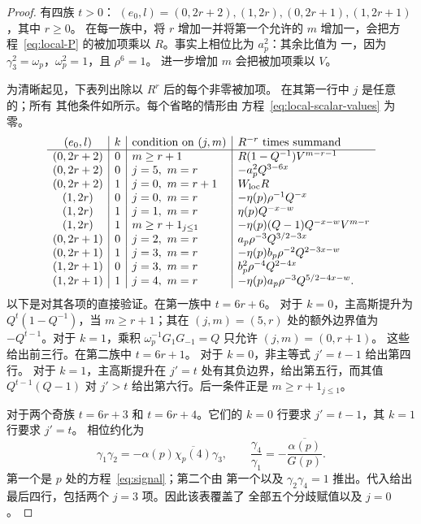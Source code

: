 \documentclass[11pt,a4paper]{article}
\numberwithin{equation}{section}
\numberwithin{figure}{section}
\theoremstyle{definition}
\theoremstyle{remark}
\begin{document}
\begin{proof}
有四族 $t>0$：
$(e_0,l)=(0,2r+2),(1,2r),(0,2r+1),(1,2r+1)$，其中 $r\ge0$。
在每一族中，将 $r$ 增加一并将第一个允许的 $m$
增加一，会把方程~\eqref{eq:local-P} 的被加项乘以
$R$。事实上相位比为 $a_p^2$：其余比值为
一，因为 $\gamma_3^2=\omega_p$，$\omega_p^2=1$，且 $\rho^6=1$。
进一步增加 $m$ 会把被加项乘以 $V$。

为清晰起见，下表列出除以 $R^r$ 后的每个非零被加项。
在其第一行中 $j$ 是任意的；所有
其他条件如所示。每个省略的情形由
方程~\eqref{eq:local-scalar-values} 为零。
\begin{equation}\label{eq:local-family-table}
\begin{array}{c|c|l|l}
 (e_0,l)&k&\text{condition on }(j,m)&R^{-r}\text{ times summand}\\\hline
 (0,2r+2)&0&m\ge r+1&R(1-Q^{-1})V^{m-r-1}\\
 (0,2r+2)&0&j=5,\ m=r&-a_p^2Q^{3-6x}\\
 (0,2r+2)&1&j=0,\ m=r+1&W_{\rm loc}R\\
 (1,2r)&0&j=0,\ m=r&-\eta(p)\rho^{-1}Q^{-x}\\
 (1,2r)&1&j=1,\ m=r&\eta(p)Q^{-x-w}\\
 (1,2r)&1&m\ge r+1_{j\le1}&-\eta(p)(Q-1)Q^{-x-w}V^{m-r}\\
 (0,2r+1)&0&j=2,\ m=r&a_p\rho^{-3}Q^{3/2-3x}\\
 (0,2r+1)&1&j=3,\ m=r&-\eta(p)b_p\rho^{-2}Q^{2-3x-w}\\
 (1,2r+1)&0&j=3,\ m=r&b_p^2\rho^{-4}Q^{2-4x}\\
 (1,2r+1)&1&j=4,\ m=r&-\eta(p)a_p\rho^{-3}Q^{5/2-4x-w}.
\end{array}
\end{equation}
以下是对其各项的直接验证。在第一族中 $t=6r+6$。
对于 $k=0$，主高斯提升为
$Q^t(1-Q^{-1})$，当 $m\ge r+1$；其在
$(j,m)=(5,r)$ 处的额外边界值为 $-Q^{t-1}$。对于 $k=1$，乘积
$\omega_p^{-1}G_1G_{-1}=Q$ 只允许 $(j,m)=(0,r+1)$。
这些给出前三行。在第二族中 $t=6r+1$。
对于 $k=0$，非主等式 $j'=t-1$ 给出第四行。
对于 $k=1$，主高斯提升在
$j'=t$ 处有其负边界，给出第五行，而其值 $Q^{t-1}(Q-1)$ 对
$j'>t$ 给出第六行。后一条件正是
$m\ge r+1_{j\le1}$。

对于两个奇族 $t=6r+3$ 和 $t=6r+4$。它们的 $k=0$
行要求 $j'=t-1$，其 $k=1$ 行要求 $j'=t$。
相位约化为
\[
 \gamma_1\gamma_2
       =-\alpha(p)\overline{\chi_p(4)}\gamma_3,
 \qquad
 \frac{\gamma_4}{\gamma_1}
       =-\frac{\overline{\alpha(p)}}{G(p)}.
\]
第一个是 $p$ 处的方程~\eqref{eq:signal}；第二个由
第一个以及 $\gamma_2\gamma_4=1$ 推出。代入给出
最后四行，包括两个 $j=3$ 项。因此该表覆盖了
全部五个分歧赋值以及 $j=0$。


\end{proof}
\end{document}
